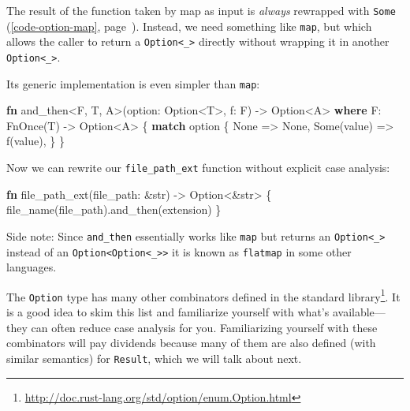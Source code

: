 \documentclass[a4paper,]{book}
\renewcommand*{\hyperlink}[2]{%
 #2 (\autoref{#1}, page~\pageref{#1})}
\newenvironment{Shaded}{\begin{snugshade}}{\end{snugshade}}
\newcommand{\KeywordTok}[1]{\textcolor[rgb]{0.13,0.29,0.53}{\textbf{{#1}}}}
\newcommand{\DataTypeTok}[1]{\textcolor[rgb]{0.13,0.29,0.53}{{#1}}}
\newcommand{\ConstantTok}[1]{\textcolor[rgb]{0.00,0.00,0.00}{{#1}}}
\newcommand{\BuiltInTok}[1]{{#1}}
\newcommand{\NormalTok}[1]{{#1}}
\renewcommand{\href}[2]{#2\footnote{\url{#1}}}
\begin{document}
The result of the function taken by map as input is \emph{always}
\protect\hyperlink{code-option-map}{rewrapped with \texttt{Some}}.
Instead, we need something like \texttt{map}, but which allows the
caller to return a \texttt{Option\textless{}\_\textgreater{}} directly
without wrapping it in another
\texttt{Option\textless{}\_\textgreater{}}.

Its generic implementation is even simpler than \texttt{map}:

\begin{Shaded}
\begin{Highlighting}[]
\KeywordTok{fn} \NormalTok{and_then<F, T, A>(option: }\DataTypeTok{Option}\NormalTok{<T>, f: F) -> }\DataTypeTok{Option}\NormalTok{<A>}
        \KeywordTok{where} \NormalTok{F: }\BuiltInTok{FnOnce}\NormalTok{(T) -> }\DataTypeTok{Option}\NormalTok{<A> \{}
    \KeywordTok{match} \NormalTok{option \{}
        \ConstantTok{None} \NormalTok{=> }\ConstantTok{None}\NormalTok{,}
        \ConstantTok{Some}\NormalTok{(value) => f(value),}
    \NormalTok{\}}
\NormalTok{\}}
\end{Highlighting}
\end{Shaded}

Now we can rewrite our \texttt{file\_path\_ext} function without
explicit case analysis:

\begin{Shaded}
\begin{Highlighting}[]
\KeywordTok{fn} \NormalTok{file_path_ext(file_path: &}\DataTypeTok{str}\NormalTok{) -> }\DataTypeTok{Option}\NormalTok{<&}\DataTypeTok{str}\NormalTok{> \{}
    \NormalTok{file_name(file_path).and_then(extension)}
\NormalTok{\}}
\end{Highlighting}
\end{Shaded}

Side note: Since \texttt{and\_then} essentially works like \texttt{map}
but returns an \texttt{Option\textless{}\_\textgreater{}} instead of an
\texttt{Option\textless{}Option\textless{}\_\textgreater{}\textgreater{}}
it is known as \texttt{flatmap} in some other languages.

The \texttt{Option} type has many other combinators
\href{http://doc.rust-lang.org/std/option/enum.Option.html}{defined in
the standard library}. It is a good idea to skim this list and
familiarize yourself with what's available---they can often reduce case
analysis for you. Familiarizing yourself with these combinators will pay
dividends because many of them are also defined (with similar semantics)
for \texttt{Result}, which we will talk about next.
\end{document}
